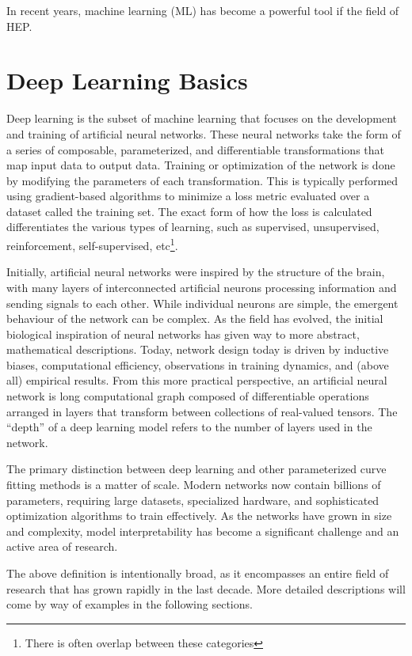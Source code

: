 In recent years, machine learning (ML) has become a powerful tool if the field of HEP.

\chapter{Deep Learning Basics}

Deep learning is the subset of machine learning that focuses on the development and training of artificial neural networks.
These neural networks take the form of a series of composable, parameterized, and differentiable transformations that map input data to output data.
Training or optimization of the network is done by modifying the parameters of each transformation.
This is typically performed using gradient-based algorithms to minimize a loss metric evaluated over a dataset called the training set.
The exact form of how the loss is calculated differentiates the various types of learning, such as supervised, unsupervised, reinforcement, self-supervised, etc\footnote{There is often overlap between these categories}.

Initially, artificial neural networks were inspired by the structure of the brain, with many layers of interconnected artificial neurons processing information and sending signals to each other.
While individual neurons are simple, the emergent behaviour of the network can be complex.
As the field has evolved, the initial biological inspiration of neural networks has given way to more abstract, mathematical descriptions.
Today, network design today is driven by inductive biases, computational efficiency, observations in training dynamics, and (above all) empirical results.
From this more practical perspective, an artificial neural network is long computational graph composed of differentiable operations arranged in layers that transform between collections of real-valued tensors.
The ``depth'' of a deep learning model refers to the number of layers used in the network.

The primary distinction between deep learning and other parameterized curve fitting methods is a matter of scale.
Modern networks now contain billions of parameters, requiring large datasets, specialized hardware, and sophisticated optimization algorithms to train effectively.
As the networks have grown in size and complexity, model interpretability has become a significant challenge and an active area of research.

The above definition is intentionally broad, as it encompasses an entire field of research that has grown rapidly in the last decade.
More detailed descriptions will come by way of examples in the following sections.

